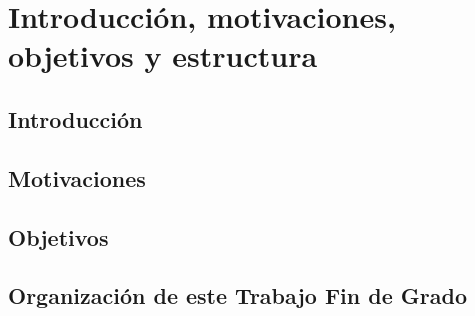 \chapter{Introducción, motivaciones, objetivos y estructura}
	\label{chap:one}
    
\section{Introducción}


\section{Motivaciones}


\section{Objetivos}


\section{Organización de este Trabajo Fin de Grado}

